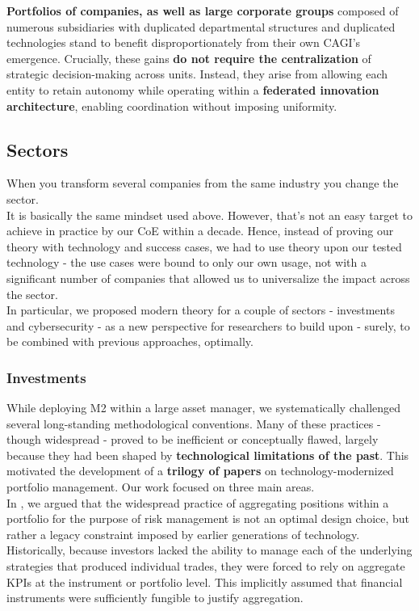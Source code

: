 \documentclass{article}
\begin{document}
\textbf{Portfolios of companies, as well as large corporate groups} composed of numerous subsidiaries with duplicated departmental structures and duplicated technologies stand to benefit disproportionately from their own CAGI’s emergence. Crucially, these gains \textbf{do not require the centralization} of strategic decision-making across units. Instead, they arise from allowing each entity to retain autonomy while operating within a \textbf{federated innovation architecture}, enabling coordination without imposing uniformity.\\

\subsection{Sectors}
\label{subsection: Sectors}

When you transform several companies from the same industry you change the sector.\\

It is basically the same mindset used above. However, that’s not an easy target to achieve in practice by our CoE within a decade. Hence, instead of proving our theory with technology and success cases, we had to use theory upon our tested technology - the use cases were bound to only our own usage, not with a significant number of companies that allowed us to universalize the impact across the sector.\\

In particular, we proposed modern theory for a couple of sectors - investments and cybersecurity - as a new perspective for researchers to build upon - surely, to be combined with previous approaches, optimally.\\

\subsubsection{Investments}
\label{subsubsection: Investments}
While deploying M2 within a large asset manager, we systematically challenged several long-standing methodological conventions. Many of these practices - though widespread - proved to be inefficient or conceptually flawed, largely because they had been shaped by \textbf{technological limitations of the past}. This motivated the development of a \textbf{trilogy of papers} on technology-modernized portfolio management. Our work focused on three main areas.\\

In \cite{DDP}, we argued that the widespread practice of aggregating positions within a portfolio for the purpose of risk management is not an optimal design choice, but rather a legacy constraint imposed by earlier generations of technology. Historically, because investors lacked the ability to manage each of the underlying strategies that produced individual trades, they were forced to rely on aggregate KPIs at the instrument or portfolio level. This implicitly assumed that financial instruments were sufficiently fungible to justify aggregation.\\
\end{document}
